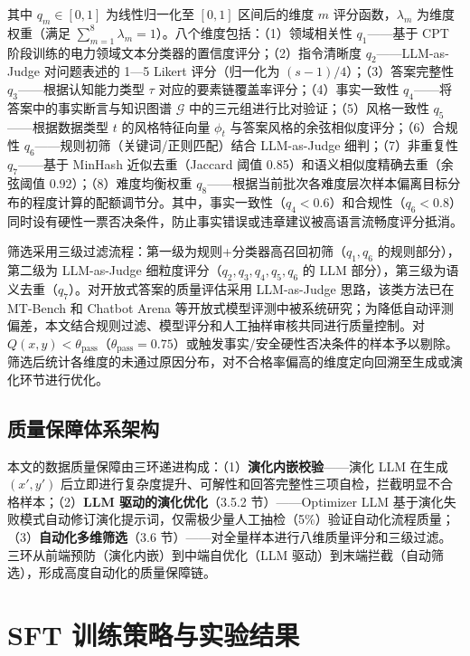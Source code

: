 \documentclass[fontset=fandol,type=master,campus=shenzhen,etitleauto=true]{hithesisbook}
\begin{document}
其中 $q_m \in [0, 1]$ 为线性归一化至 $[0,1]$ 区间后的维度 $m$ 评分函数，$\lambda_m$ 为维度权重（满足 $\sum_{m=1}^{8}\lambda_m = 1$）。八个维度包括：（1）领域相关性 $q_1$——基于 CPT 阶段训练的电力领域文本分类器的置信度评分；（2）指令清晰度 $q_2$——LLM-as-Judge 对问题表述的 1---5 Likert 评分（归一化为 $(s-1)/4$）；（3）答案完整性 $q_3$——根据认知能力类型 $\tau$ 对应的要素链覆盖率评分；（4）事实一致性 $q_4$——将答案中的事实断言与知识图谱 $\mathcal{G}$ 中的三元组进行比对验证；（5）风格一致性 $q_5$——根据数据类型 $t$ 的风格特征向量 $\phi_t$ 与答案风格的余弦相似度评分；（6）合规性 $q_6$——规则初筛（关键词/正则匹配）结合 LLM-as-Judge 细判；（7）非重复性 $q_7$——基于 MinHash 近似去重（Jaccard 阈值 0.85）和语义相似度精确去重（余弦阈值 0.92）；（8）难度均衡权重 $q_8$——根据当前批次各难度层次样本偏离目标分布的程度计算的配额调节分。其中，事实一致性（$q_4 < 0.6$）和合规性（$q_6 < 0.8$）同时设有硬性一票否决条件，防止事实错误或违章建议被高语言流畅度评分抵消。

筛选采用三级过滤流程：第一级为规则+分类器高召回初筛（$q_1, q_6$ 的规则部分），第二级为 LLM-as-Judge 细粒度评分（$q_2, q_3, q_4, q_5, q_6$ 的 LLM 部分），第三级为语义去重（$q_7$）。对开放式答案的质量评估采用 LLM-as-Judge 思路，该类方法已在 MT-Bench 和 Chatbot Arena 等开放式模型评测中被系统研究\cite{ref65}；为降低自动评测偏差，本文结合规则过滤、模型评分和人工抽样审核共同进行质量控制。对 $Q(x, y) < \theta_{\text{pass}}$（$\theta_{\text{pass}} = 0.75$）或触发事实/安全硬性否决条件的样本予以剔除。筛选后统计各维度的未通过原因分布，对不合格率偏高的维度定向回溯至生成或演化环节进行优化。

\subsection{质量保障体系架构}\label{ux8d28ux91cfux4fddux969cux4f53ux7cfbux67b6ux6784}

本文的数据质量保障由三环递进构成：（1）\textbf{演化内嵌校验}------演化 LLM 在生成 $(x', y')$ 后立即进行复杂度提升、可解性和回答完整性三项自检，拦截明显不合格样本；（2）\textbf{LLM 驱动的演化优化}（3.5.2 节）------Optimizer LLM 基于演化失败模式自动修订演化提示词，仅需极少量人工抽检（5\%）验证自动化流程质量；（3）\textbf{自动化多维筛选}（3.6 节）------对全量样本进行八维质量评分和三级过滤。三环从前端预防（演化内嵌）到中端自优化（LLM 驱动）到末端拦截（自动筛选），形成高度自动化的质量保障链。

\section{SFT 训练策略与实验结果}\label{sft-ux8badux7ec3ux4e0eux5b9eux9a8cux7ed3ux679c}
\end{document}
